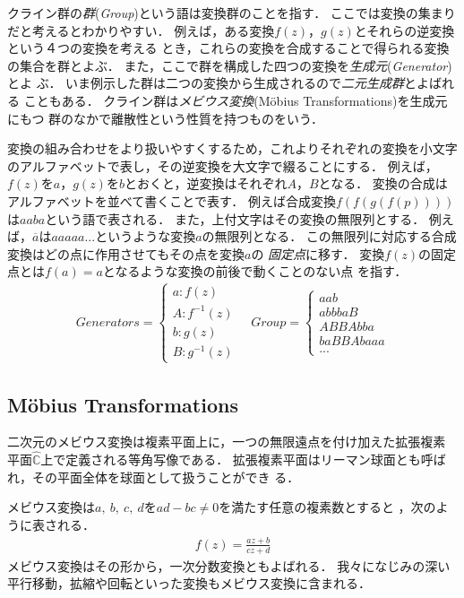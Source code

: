 クライン群の\emph{群}(\textit{Group})という語は変換群のことを指す．
ここでは変換の集まりだと考えるとわかりやすい．
例えば，ある変換$f(z)$，$g(z)$とそれらの逆変換という４つの変換を考える
とき，これらの変換を合成することで得られる変換の集合を群とよぶ．
また，ここで群を構成した四つの変換を\emph{生成元}(\textit{Generator})とよ
ぶ．
いま例示した群は二つの変換から生成されるので\emph{二元生成群}とよばれる
こともある．
クライン群は\emph{メビウス変換}(M\"obius Transformations)を生成元にもつ
群のなかで離散性という性質を持つものをいう．

変換の組み合わせをより扱いやすくするため，これよりそれぞれの変換を小文字
のアルファベットで表し，その逆変換を大文字で綴ることにする．
例えば，$f(z)$を$a$，$g(z)$を$b$とおくと，逆変換はそれぞれ$A$，$B$となる．
変換の合成はアルファベットを並べて書くことで表す．
例えば合成変換$f(f(g(f(p))))$は$aaba$という語で表される．
また，上付文字はその変換の無限列とする．
例えば，$\overline{a}$は$aaaaa...$というような変換$a$の無限列となる．
この無限列に対応する合成変換はどの点に作用させてもその点を変換$a$の
\emph{固定点}に移す．
変換$f(z)$の固定点とは$f(a) = a$となるような変換の前後で動くことのない点
を指す．
 \begin{align*}
  Generators =
   \begin{cases}
    a \colon f(z) \\
    A \colon f^{-1}(z) \\
    b \colon g(z) \\
    B \colon g^{-1}(z)
   \end{cases}
  \quad
  Group =
   \begin{cases}
    aab\\
    abbbaB \\
    ABBAbba \\
    baBBAbaaa \\
    ...
   \end{cases}
 \end{align*}

\subsection{M\"obius Transformations}

二次元のメビウス変換は複素平面上に，一つの無限遠点を付け加えた拡張複素
平面$\hat{\mathbb{C}}$上で定義される等角写像である．
拡張複素平面はリーマン球面とも呼ばれ，その平面全体を球面として扱うことができ
る．

メビウス変換は$a,~b,~c,~d$を$ad - bc \neq 0$を満たす任意の複素数とすると
，次のように表される．
\begin{align*}
 f(z) = \frac{az + b}{cz + d}
\end{align*}
メビウス変換はその形から，一次分数変換ともよばれる．
我々になじみの深い平行移動，拡縮や回転といった変換もメビウス変換に含まれる．

